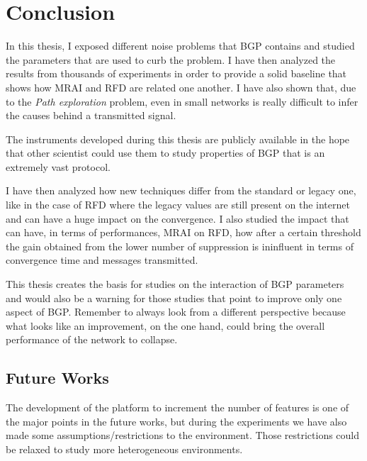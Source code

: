 \chapter{Conclusion}
\label{cha:conclusion}

In this thesis, I exposed different noise problems that \ac{BGP} contains and
studied the parameters that are used to curb the problem.
I have then analyzed the results from thousands of experiments in order to
provide a solid baseline that shows how \ac{MRAI} and \ac{RFD} are related
one another.
I have also shown that, due to the \textit{Path exploration} problem, even
in small networks is really difficult to infer the causes behind a transmitted
signal.

The instruments developed during this thesis are publicly available in the
hope that other scientist could use them to study properties of \ac{BGP} that
is an extremely vast protocol.

I have then analyzed how new techniques differ from the standard or legacy one,
like in the case of \ac{RFD} where the legacy values are still present on the
internet and can have a huge impact on the convergence.
I also studied the impact that can have, in terms of performances, \ac{MRAI} on \ac{RFD},
how after a certain threshold the gain obtained from the lower number of
suppression is ininfluent in terms of convergence time and messages transmitted.

This thesis creates the basis for studies on the interaction of \ac{BGP} parameters
and would also be a warning for those studies that point to improve only
one aspect of \ac{BGP}.
Remember to always look from a different perspective because what looks like an
improvement, on the one hand, could bring the overall performance of the
network to collapse.


\section{Future Works}
\label{sec:future_works}

The development of the platform to increment the number of features is one of
the major points in the future works, but during the experiments we have also
made some assumptions/restrictions to the environment.
Those restrictions could be relaxed to study more heterogeneous environments.

